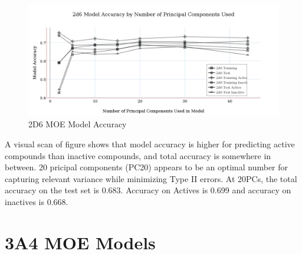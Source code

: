\begin{figure}[!htbp]
\includegraphics[width=1\textwidth]{../img/2d6_moe_model_accuracy.png}
\caption{2D6 MOE Model Accuracy}
\end{figure}

A visual scan of figure shows that model accuracy is higher for predicting active compounds than inactive compounds, and total accuracy is somewhere in between. 20 pricipal components (PC20) appears to be an optimal number for capturing relevant variance while minimizing Type II errors. At 20PCs, the total accuracy on the test set is 0.683. Accuracy on Actives is 0.699 and accuracy on inactives is 0.668.


\section{3A4 MOE Models}

